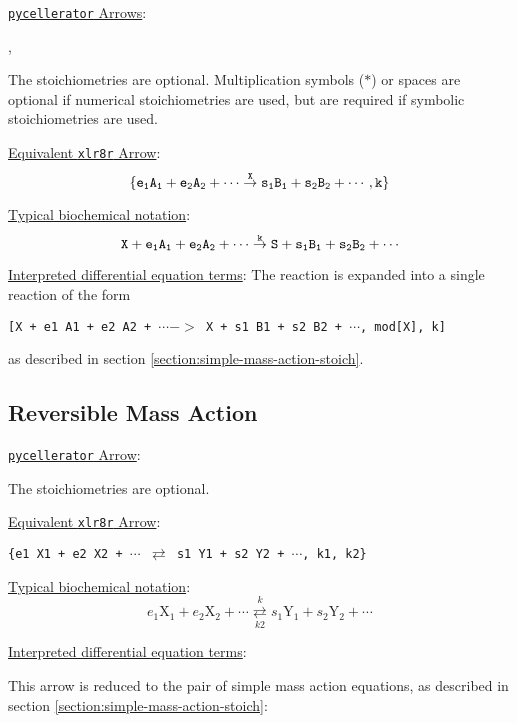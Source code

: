\underline{{\tt pycellerator} Arrows}: \begin{center}
,

\end{center} 
The stoichiometries are optional. Multiplication symbols ($*$) or spaces are optional if numerical stoichiometries are used, but are required if symbolic stoichiometries are used. 

\underline{Equivalent {\tt xlr8r} Arrow}: 
$$\tt\{e_1 A_1 + e_2 A_2 + \cdots \overset{X}{\to} s_1 B_1 + s_2 B_2 + \cdots, k\}$$

\underline{Typical biochemical notation}: $$\tt{X + e_1 A_1 + e_2 A_2 + \cdots \overset{k}{\to} S + s_1 B_1 + s_2 B_2 + \cdots}$$

\underline{Interpreted differential equation terms}: 
The reaction is expanded into a single reaction of the form 

 \begin{center}
{\tt [X + e1 A1 + e2 A2 + $\cdots ->$ X + s1 B1 + s2 B2 + $\cdots$, mod[X], k]}
\end{center} 
as described in section \ref{section:simple-mass-action-stoich}.


\subsection{Reversible Mass Action}
\label{section:reversible-mass-action}


\underline{{\tt pycellerator} Arrow}: \begin{center}
\end{center}
The stoichiometries are optional.

\underline{Equivalent {\tt xlr8r} Arrow}: \begin{center}
{\tt \{e1 X1 + e2 X2 + $\cdots$  $\rightleftarrows$ s1 Y1 + s2 Y2 + $\cdots$, k1, k2\}}
\end{center}
\underline{Typical biochemical notation}: $$e_1 \text{X}_1 + e_2 \text{X}_2 + \cdots \underset{k2}{\overset{k}{\rightleftarrows}} s_1\text{Y}_1 + s_2\text{Y}_2 + \cdots$$



\underline{Interpreted differential equation terms}: 

This arrow is reduced to the pair of simple mass action equations, as described in section \ref{section:simple-mass-action-stoich}: 

